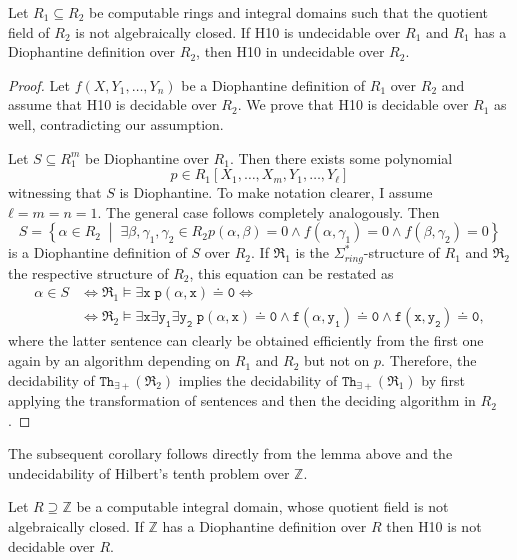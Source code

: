 \begin{lem} \label{lem:moving up}
Let \(R_1 \subseteq R_2\) be computable rings and integral domains such
that the quotient field of \(R_2\) is not algebraically closed. If \textsc{H10}
is undecidable over \(R_1\) and \(R_1\) has a Diophantine definition over
\(R_2\), then \textsc{H10} in undecidable over \(R_2\).
\end{lem}
\begin{proof}
Let \(f(X, Y_1, …, Y_n)\) be a Diophantine definition of \(R_1\) over \(R_2\) and
assume that \textsc{H10} is decidable over \(R_2\). We prove that \textsc{H10} is
decidable over \(R_1\) as well, contradicting our assumption.

Let \(S \subseteq R_1^m\) be Diophantine over \(R_1\). Then there exists some
polynomial
\[
  p ∈ R_1[X_1, …, X_m, Y_1, …, Y_ℓ]
\]
witnessing that \(S\) is
Diophantine. To make notation clearer, I assume \(ℓ = m = n = 1\). The general
case follows completely analogously. Then
\[
  S = \left\lbrace  α ∈ R_2 \;\middle|\; ∃β, γ_1, γ_2 ∈ R_2 p(α, β) = 0 ∧ f(α, γ_1) = 0 ∧ f(β, γ_2) = 0\right\rbrace
\]
is a Diophantine definition of \(S\) over \(R_2\). If \(\mathfrak R_1\) is the
\(Σ_{ring}^*\)-structure of \(R_1\) and \(\mathfrak R_2\) the respective
structure of \(R_2\), this equation can be restated as
\begin{align*}
  α ∈ S &⇔ \mathfrak R_1 \models \mathtt{∃ x \; p(α, x) \doteq 0} ⇔ \\
  &⇔\mathfrak R_2 \models \mathtt{∃ x ∃ y_1 ∃ y_2 \; p(α, x) \doteq 0 ∧ f(α, y_1) \doteq 0 ∧ f(x, y_2) \doteq 0},
\end{align*}
where the latter sentence can clearly be obtained efficiently from the first one
again by an algorithm depending on \(R_1\) and \(R_2\) but not on \(p\). Therefore,
the decidability of \(\mathtt{Th}_{∃+}(\mathfrak R_2)\) implies the decidability
of \(\mathtt{Th}_{∃+}(\mathfrak R_1)\) by first applying the transformation of
sentences and then the deciding algorithm in \(R_2\).
\end{proof}

The subsequent corollary follows directly from the lemma above and the
undecidability of Hilbert's tenth problem over \(ℤ\).

\begin{cor}
  Let \(R \supseteq ℤ\) be a computable integral domain, whose quotient field is
  not algebraically closed. If \(ℤ\) has a Diophantine definition over \(R\) then
  \textsc{H10} is not decidable over \(R\).
\end{cor}


